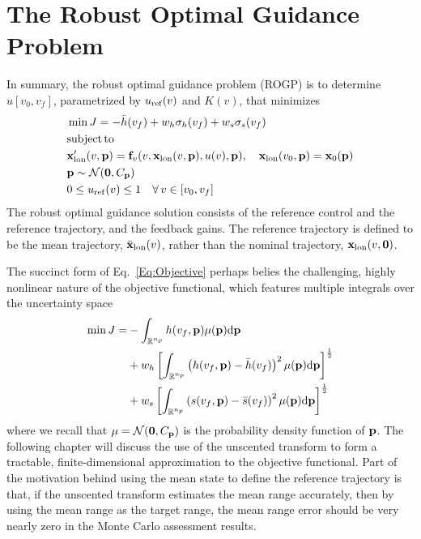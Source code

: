 \section{The Robust Optimal Guidance Problem}\label{Sec:ROGP}
In summary, the robust optimal guidance problem (ROGP) is to determine $u[v_0,v_f]$, parametrized by $u_{\mathrm{ref}}(v)$ and $K(v)$, that minimizes
\begin{align}
	&\min J = -\bar{h}(v_f) + w_h\sigma_h(v_f) + w_s\sigma_s(v_f) \nonumber\\
	&\mathrm{subject\, to }\nonumber \\
	&\mathbf{x}_{\mathrm{lon}}'(v,\mathbf{p}) = \mathbf{f}_v(v, \mathbf{x}_{\mathrm{lon}}(v,\mathbf{p}), u(v), \mathbf{p}),\quad
	\mathbf{x}_{\mathrm{lon}}(v_0,\mathbf{p}) = \mathbf{x}_0(\mathbf{p}) \label{Eq:ROGP}\\
	&\mathbf{p}\sim \mathcal{N}(\mathbf{0},C_{\mathbf{p}}) \nonumber\\
	&0 \le u_{\mathrm{ref}}(v) \le 1 \quad \forall\,v\in [v_0, v_f] \nonumber
\end{align}
The robust optimal guidance solution consists of the reference control and the reference trajectory, and the feedback gains. The reference trajectory is defined to be the mean trajectory, $\bar{\mathbf{x}}_{\mathrm{lon}}(v)$, rather than the nominal trajectory, $\mathbf{x}_{\mathrm{lon}}(v,\mathbf{0})$. 

The succinct form of Eq.~\eqref{Eq:Objective} perhaps belies the challenging, highly nonlinear nature of the objective functional, which features multiple integrals over the uncertainty space
\begin{align}
	\min J = &-\int_{\mathbb{R}^{n_p}}h(v_f,\mathbf{p})\mu(\mathbf{p})\mathrm{d}\mathbf{p} \nonumber\\
	&+ w_h\left[\int_{\mathbb{R}^{n_p}}\left(h(v_f,\mathbf{p}) - \bar{h}(v_f)\right)^2\mu(\mathbf{p})\mathrm{d}\mathbf{p}\right]^{\frac{1}{2}} \\
	&+ w_s\left[\int_{\mathbb{R}^{n_p}}\left(s(v_f,\mathbf{p}) - \bar{s}(v_f)\right)^2\mu(\mathbf{p})\mathrm{d}\mathbf{p}\right]^{\frac{1}{2}}\nonumber
\end{align}
where we recall that $\mu = \mathcal{N}(\mathbf{0},C_{\mathbf{p}})$ is the probability density function of $\mathbf{p}$. The following chapter will discuss the use of the unscented transform to form a tractable, finite-dimensional approximation to the objective functional. Part of the motivation behind using the mean state to define the reference trajectory is that, if the unscented transform estimates the mean range accurately, then by using the mean range as the target range, the mean range error should be very nearly zero in the Monte Carlo assessment results. 

